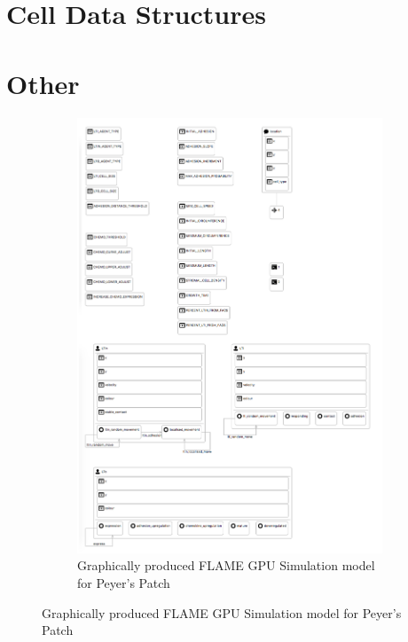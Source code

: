 \documentclass{UoYCSproject}
\begin{document}
\section{Cell Data Structures}

\section{Other}

\begin{figure}[htp]
\centering
\begin{subfigure}{\textwidth}
\centering
\includegraphics[width=\textwidth]{Appendix/ppsim_gmf}
\caption{Graphically produced \gls{FLAME GPU} Simulation model for Peyer's Patch}
\label{fig:ppsim_gmf}
\end{subfigure}%
\end{figure}
\end{document}
